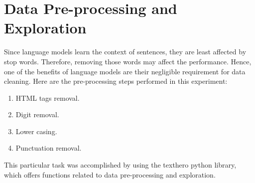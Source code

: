 \documentclass[%
	BCOR=8mm, %
	DIV=12,
	toc=bibliography, %
	toc=listof, %
	oneside, %
	egregdoesnotlikesansseriftitles, %
	]{scrbook}
\begin{document}
\section{Data Pre-processing and Exploration}
\label{section:datapreproc}
Since language models learn the context of sentences, they are least affected by stop words. Therefore, removing those words may affect the performance. Hence, one of the benefits of  language models are their negligible requirement for data cleaning. Here are the pre-processing steps performed in this experiment:
\begin{enumerate}
\item  HTML tags removal.
\item Digit removal.
\item Lower casing.
\item  Punctuation removal.
\end{enumerate}
This particular task was accomplished by using the texthero python library, which offers functions related to data pre-processing and exploration.
\end{document}
